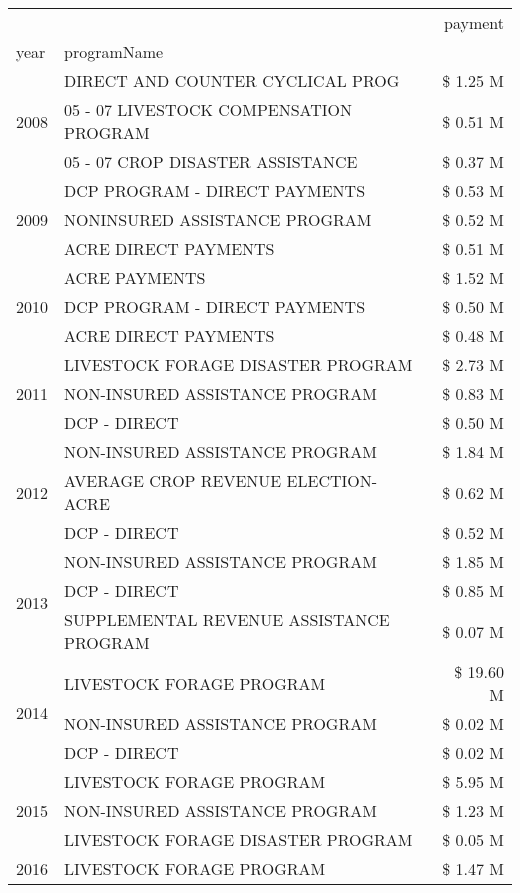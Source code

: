 \begin{tabular}{llr}
\toprule
 &  & payment \\
year & programName &  \\
\midrule
\multirow[t]{3}{*}{2008} & DIRECT AND COUNTER CYCLICAL PROG & \$ 1.25 M \\
 & 05 - 07 LIVESTOCK COMPENSATION PROGRAM & \$ 0.51 M \\
 & 05 - 07 CROP DISASTER ASSISTANCE & \$ 0.37 M \\
\cline{1-3}
\multirow[t]{3}{*}{2009} & DCP PROGRAM - DIRECT PAYMENTS & \$ 0.53 M \\
 & NONINSURED ASSISTANCE PROGRAM & \$ 0.52 M \\
 & ACRE DIRECT PAYMENTS & \$ 0.51 M \\
\cline{1-3}
\multirow[t]{3}{*}{2010} & ACRE PAYMENTS & \$ 1.52 M \\
 & DCP PROGRAM - DIRECT PAYMENTS & \$ 0.50 M \\
 & ACRE DIRECT PAYMENTS & \$ 0.48 M \\
\cline{1-3}
\multirow[t]{3}{*}{2011} & LIVESTOCK FORAGE DISASTER PROGRAM & \$ 2.73 M \\
 & NON-INSURED ASSISTANCE PROGRAM & \$ 0.83 M \\
 & DCP - DIRECT & \$ 0.50 M \\
\cline{1-3}
\multirow[t]{3}{*}{2012} & NON-INSURED ASSISTANCE PROGRAM & \$ 1.84 M \\
 & AVERAGE CROP REVENUE ELECTION-ACRE & \$ 0.62 M \\
 & DCP - DIRECT & \$ 0.52 M \\
\cline{1-3}
\multirow[t]{3}{*}{2013} & NON-INSURED ASSISTANCE PROGRAM & \$ 1.85 M \\
 & DCP - DIRECT & \$ 0.85 M \\
 & SUPPLEMENTAL REVENUE ASSISTANCE PROGRAM & \$ 0.07 M \\
\cline{1-3}
\multirow[t]{3}{*}{2014} & LIVESTOCK FORAGE PROGRAM & \$ 19.60 M \\
 & NON-INSURED ASSISTANCE PROGRAM & \$ 0.02 M \\
 & DCP - DIRECT & \$ 0.02 M \\
\cline{1-3}
\multirow[t]{3}{*}{2015} & LIVESTOCK FORAGE PROGRAM & \$ 5.95 M \\
 & NON-INSURED ASSISTANCE PROGRAM & \$ 1.23 M \\
 & LIVESTOCK FORAGE DISASTER PROGRAM & \$ 0.05 M \\
\cline{1-3}
\multirow[t]{3}{*}{2016} & LIVESTOCK FORAGE PROGRAM & \$ 1.47 M \\

\end{tabular}
